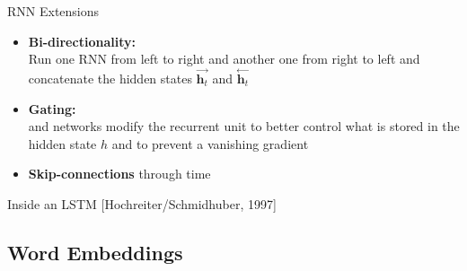 \begin{frame}{RNN Extensions}{}\optional
	\begin{itemize}
		\item \textbf{Bi-directionality:} \\
			Run one RNN from left to right and another one from right to left and concatenate the hidden states
			$\overset{\rightarrow}{\bm{h}_t}$ and $\overset{\leftarrow}{\bm{h}_t}$
		\item \textbf{Gating:} \\
			 and  networks modify the recurrent unit
			to better control what is stored in the hidden state $h$ and to prevent a vanishing gradient
		\item \textbf{Skip-connections} through time
	\end{itemize}
\end{frame}


\begin{frame}{Inside an LSTM [Hochreiter/Schmidhuber, 1997]}{}\optional
\end{frame}


\subsection{Word Embeddings}

